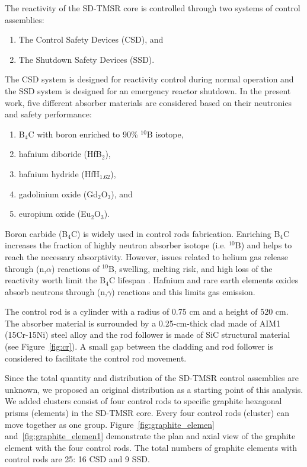 The reactivity of the SD-TMSR core is controlled through two systems of control assemblies:
\begin{enumerate}
\item The Control Safety Devices (CSD), and
\item The Shutdown Safety Devices (SSD).
\end{enumerate}
The CSD system is designed for reactivity control during normal operation and the SSD system is designed for an emergency reactor shutdown.
In the present work, five different absorber materials are considered based on their neutronics and safety performance:
\begin{enumerate}
\item B$_4$C with boron enriched to 90\% $^{10}$B isotope,
\item hafnium diboride (HfB$_2$),
\item hafnium hydride (HfH$_{1.62}$),
\item gadolinium oxide (Gd$_2$O$_3$), and
\item europium oxide (Eu$_2$O$_3$).
\end{enumerate}
Boron carbide (B$_4$C) is widely used in control rods fabrication. Enriching B$_4$C increases the fraction of highly neutron absorber isotope (i.e. $^{10}$B) and helps to reach the necessary absorptivity. However, issues related to helium gas release through (n,$\alpha$) reactions of $^{10}$B, swelling, melting risk, and high loss of the reactivity worth limit the B$_4$C lifespan \cite{guo2019optimized}. Hafnium and rare earth elements oxides absorb neutrons through (n,$\gamma$) reactions and this limits gas emission.

The control rod is a cylinder with a radius of 0.75 cm and a height of 520 cm. The absorber material is surrounded by a 0.25-cm-thick clad made of AIM1 (15Cr-15Ni) steel alloy \cite{SERAN2017285} and the rod follower is made of SiC structural material (see Figure~\ref{fig:cr}). A small gap between the cladding and rod follower is considered to facilitate the control rod movement.

Since the total quantity and distribution of the SD-TMSR control assemblies are unknown, we proposed an original distribution as a starting point of this analysis. We added clusters consist of four control rods to specific graphite hexagonal prisms (elements) in the SD-TMSR core. Every four control rods (cluster) can move together as one group. Figure~\ref{fig:graphite_elemen} and~\ref{fig:graphite_elemen1} demonstrate the plan and axial view of the graphite element with the four control rods. The total numbers of graphite elements with control rods are 25: 16 CSD and 9 SSD.


